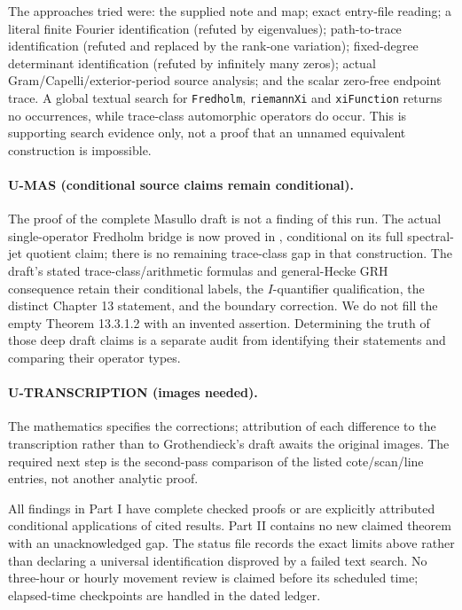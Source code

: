 The approaches tried were: the supplied note and map; exact entry-file reading; a literal finite Fourier identification (refuted by eigenvalues); path-to-trace identification (refuted and replaced by the rank-one variation); fixed-degree determinant identification (refuted by infinitely many zeros); actual Gram/Capelli/exterior-period source analysis; and the scalar zero-free endpoint trace. A global textual search for \texttt{Fredholm}, \texttt{riemannXi} and \texttt{xiFunction} returns no occurrences, while trace-class automorphic operators do occur. This is supporting search evidence only, not a proof that an unnamed equivalent construction is impossible.

\paragraph{U-MAS (conditional source claims remain conditional).}
The proof of the complete Masullo draft is not a finding of this run. The actual single-operator Fredholm bridge is now proved in , conditional on its full spectral-jet quotient claim; there is no remaining trace-class gap in that construction. The draft's stated trace-class/arithmetic formulas and general-Hecke GRH consequence retain their conditional labels, the $I$-quantifier qualification, the distinct Chapter 13 statement, and the boundary correction. We do not fill the empty Theorem 13.3.1.2 with an invented assertion. Determining the truth of those deep draft claims is a separate audit from identifying their statements and comparing their operator types.

\paragraph{U-TRANSCRIPTION (images needed).}
The mathematics specifies the corrections; attribution of each difference to the transcription rather than to Grothendieck's draft awaits the original images. The required next step is the second-pass comparison of the listed cote/scan/line entries, not another analytic proof.

All findings in Part I have complete checked proofs or are explicitly attributed conditional applications of cited results. Part II contains no new claimed theorem with an unacknowledged gap. The status file records the exact limits above rather than declaring a universal identification disproved by a failed text search. No three-hour or hourly movement review is claimed before its scheduled time; elapsed-time checkpoints are handled in the dated ledger.

